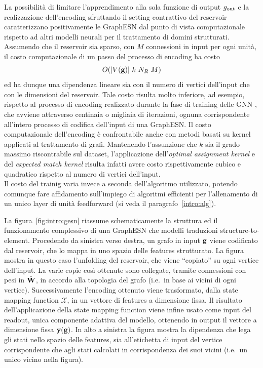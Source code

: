 La possibilità di limitare l'apprendimento alla sola funzione di output $g_\textup{out}$ e la realizzazione dell'encoding sfruttando il setting contrattivo del reservoir caratterizzano positivamente le GraphESN dal punto di vista computazionale rispetto ad altri modelli neurali per il trattamento di domini strutturati.\\
Assumendo che il reservoir sia sparso, con $M$ connessioni in input per ogni unità, il costo computazionale di un passo del processo di encoding ha costo
\begin{equation}
O(\lvert V(\mathbf{g})\rvert\ k\ N_R\ M)
\end{equation}
ed ha dunque una dipendenza lineare sia con il numero di vertici dell'input che con le dimensioni del reservoir. Tale costo risulta molto inferiore, ad esempio, rispetto al processo di encoding realizzato durante la fase di training delle GNN \cite{Scarselli:GNN}, che avviene attraverso centinaia o migliaia di iterazioni, ognuna corrispondente all'intero processo di codifica dell'input di una GraphESN. 
Il costo computazionale dell'encoding è confrontabile anche con metodi basati su kernel applicati al trattamento di grafi. Mantenendo l'assunzione che $k$ sia il grado massimo riscontrabile sul dataset, l'applicazione dell'\emph{optimal assignment kernel} e del \emph{expected match kernel} \cite{Frohlich:AssignmentKernels} risulta infatti avere costo rispettivamente cubico e quadratico rispetto al numero di vertici dell'input.\\
Il costo del trainig varia invece a seconda dell'algoritmo utilizzato, potendo comunque fare affidamento sull'impiego di algoritmi efficienti per l'allenamento di un unico layer di unità feedforward (si veda il paragrafo~\ref{intro:alg}).

La figura~\vref{fig:intro:gesn} riassume schematicamente la struttura ed il funzionamento complessivo di una GraphESN che modelli traduzioni structure-to-element. Procedendo da sinistra verso destra, un grafo in input $\mathbf{g}$ viene codificato dal reservoir, che lo mappa in uno spazio delle features strutturato. La figura mostra in questo caso l'unfolding del reservoir, che viene ``copiato'' su ogni vertice dell'input. La varie copie così ottenute sono collegate, tramite connessioni con pesi in $\hat{\matr{W}}$, in accordo alla topologia del grafo (i.e.\ in base ai vicini di ogni vertice). Successivamente l'encoding ottenuto viene trasformato, dalla state mapping function $\mathcal{X}$, in un vettore di features a dimensione fissa. Il risultato dell'applicazione della state mapping function viene infine usato come input del readout, unica componente adattiva del modello, ottenendo in output il vettore a dimensione fissa $\mathbf{y}(\mathbf{g})$. In alto a sinistra la figura mostra la dipendenza che lega gli stati nello spazio delle features, sia all'etichetta di input del vertice corrispondente che agli stati calcolati in corrispondenza dei suoi vicini (i.e.\ un unico vicino nella figura).

